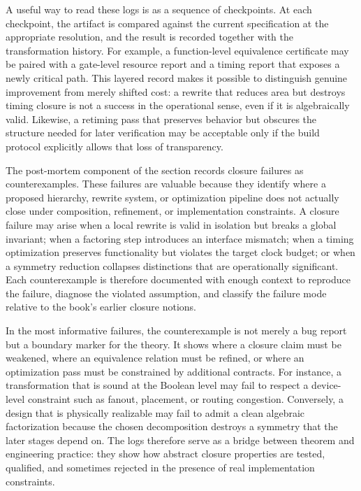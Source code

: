 \documentclass[11pt]{article}
\begin{document}
A useful way to read these logs is as a sequence of checkpoints. At each checkpoint, the artifact is compared against the current specification at the appropriate resolution, and the result is recorded together with the transformation history. For example, a function-level equivalence certificate may be paired with a gate-level resource report and a timing report that exposes a newly critical path. This layered record makes it possible to distinguish genuine improvement from merely shifted cost: a rewrite that reduces area but destroys timing closure is not a success in the operational sense, even if it is algebraically valid. Likewise, a retiming pass that preserves behavior but obscures the structure needed for later verification may be acceptable only if the build protocol explicitly allows that loss of transparency.

The post-mortem component of the section records closure failures as counterexamples. These failures are valuable because they identify where a proposed hierarchy, rewrite system, or optimization pipeline does not actually close under composition, refinement, or implementation constraints. A closure failure may arise when a local rewrite is valid in isolation but breaks a global invariant; when a factoring step introduces an interface mismatch; when a timing optimization preserves functionality but violates the target clock budget; or when a symmetry reduction collapses distinctions that are operationally significant. Each counterexample is therefore documented with enough context to reproduce the failure, diagnose the violated assumption, and classify the failure mode relative to the book's earlier closure notions.

In the most informative failures, the counterexample is not merely a bug report but a boundary marker for the theory. It shows where a closure claim must be weakened, where an equivalence relation must be refined, or where an optimization pass must be constrained by additional contracts. For instance, a transformation that is sound at the Boolean level may fail to respect a device-level constraint such as fanout, placement, or routing congestion. Conversely, a design that is physically realizable may fail to admit a clean algebraic factorization because the chosen decomposition destroys a symmetry that the later stages depend on. The logs therefore serve as a bridge between theorem and engineering practice: they show how abstract closure properties are tested, qualified, and sometimes rejected in the presence of real implementation constraints.
\end{document}
